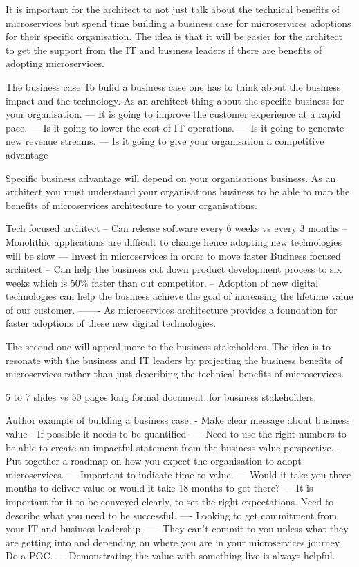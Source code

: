\documentclass[a4paper, 11pt]{book}
\begin{document}
    It is important for the architect to not just talk about the technical benefits of microservices but spend time building a business case for microservices adoptions for their specific organisation.
    The idea is that it will be easier for the architect to get the support from the IT and business leaders if there are benefits of adopting microservices.

    The business case
    To bulid a business case one has to think about the business impact and the technology.
    As an architect thing about the specific business for your organisation.
    --- It is going to improve the customer experience at a rapid pace.
    --- Is it going to lower the cost of IT operations.
    --- Is it going to generate new revenue streams.
    --- Is it going to give your organisation a competitive advantage

    Specific business advantage will depend on your organisations business.
    As an architect you must understand your organisations business to be able to map the benefits of microservices architecture to your organisations.

    Tech focused architect
    -- Can release software every 6 weeks vs every 3 months
    -- Monolithic applications are difficult to change hence adopting new technologies will be slow
    --- Invest in microservices in order to move faster
    Business focused architect
    -- Can help the business cut down product development process to six weeks which is 50\% faster than out competitor.
    -- Adoption of new digital technologies can help the business achieve the goal of increasing the lifetime value of our customer.
    ------- As microservices architecture provides a foundation for faster adoptions of these new digital technologies.

    The second one will appeal more to the business stakeholders.
    The idea is to resonate with the business and IT leaders by projecting the business benefits of microservices rather than just describing the technical benefits of microservices.

    5 to 7 slides vs 50 pages long formal document..for business stakeholders.

    Author example of building a business case.
    - Make clear message about business value
    - If possible it needs to be quantified
    ---- Need to use the right numbers to be able to create an impactful statement from the business value perspective.
    - Put together a roadmap on how you expect the organisation to adopt microservices.
    --- Important to indicate time to value.
    --- Would it take you three months to deliver value or would it take 18 months to get there?
    --- It is important for it to be conveyed clearly, to set the right expectations. Need to describe what you need to be successful.
    ---- Looking to get commitment from your IT and business leadership.
    ---- They can't commit to you unless what they are getting into and depending on where you are in your microservices journey. Do a POC.
    --- Demonstrating the value with something live is always helpful.
\end{document}
